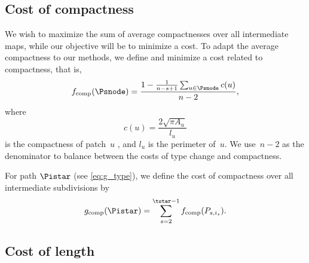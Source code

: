 

\subsection{Cost of compactness}


We wish to maximize the sum of average compactnesses 
over all intermediate maps,
while our objective will be to minimize a cost.
To adapt the average compactness to our methods, 
we define and minimize a cost related to compactness, that is,
\begin{equation}
\label{eq:f_comp}
f_{\mathrm{comp}}(\Psnode)=
\frac{1-\frac{1}{n-s+1} \sum_{u\in \Psnode}c(u)}{n-2},
\end{equation}
where
\begin{equation}
\label{eq:comp}
c(u)=\frac{2 \sqrt{\pi A_u}}{l_u}
\end{equation}
is the compactness of patch~$u$ \citep{Frolov1975}, 
and $l_u$ is the perimeter of~$u$. 
We use~$n-2$ as the denominator to balance 
between the costs of type change and compactness.

For path $\Pistar$ (see \eq\ref{eq:g_type}), 
we define the cost of compactness over all 
intermediate subdivisions by
\begin{equation}
\label{eq:g_comp}
g_\mathrm{comp}(\Pistar)=
\sum_{s=2}^{\tstar-1}f_{\mathrm{comp}}(P_{s,i_s}).
\end{equation}


\subsection{Cost of length}
\label{sec:AreaAgg_costlength}

